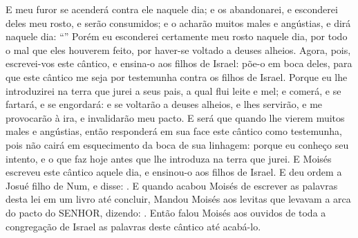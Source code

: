 {{  E meu furor se acenderá contra ele naquele dia; e os abandonarei, e esconderei deles meu rosto, e serão consumidos; e o acharão muitos males e angústias, e dirá naquele dia: \enquote{}
  Porém eu esconderei certamente meu rosto naquele dia, por todo o mal que eles houverem feito, por haver-se voltado a deuses alheios.
  Agora, pois, escrevei-vos este cântico, e ensina-o aos filhos de Israel: põe-o em boca deles, para que este cântico me seja por testemunha contra os filhos de Israel.
  Porque eu lhe introduzirei na terra que jurei a seus pais, a qual flui leite e mel; e comerá, e se fartará, e se engordará: e se voltarão a deuses alheios, e lhes servirão, e me provocarão à ira, e invalidarão meu pacto.
  E será que quando lhe vierem muitos males e angústias, então responderá em sua face este cântico como testemunha, pois não cairá em esquecimento da boca de sua linhagem: porque eu conheço seu intento, e o que faz hoje antes que lhe introduza na terra que jurei}.
  E Moisés escreveu este cântico aquele dia, e ensinou-o aos filhos de Israel.
  E deu ordem a Josué filho de Num, e disse: .
  E quando acabou Moisés de escrever as palavras desta lei em um livro até concluir,
  Mandou Moisés aos levitas que levavam a arca do pacto do SENHOR, dizendo:
  .
  Então falou Moisés aos ouvidos de toda a congregação de Israel as palavras deste cântico até acabá-lo.
\par }

